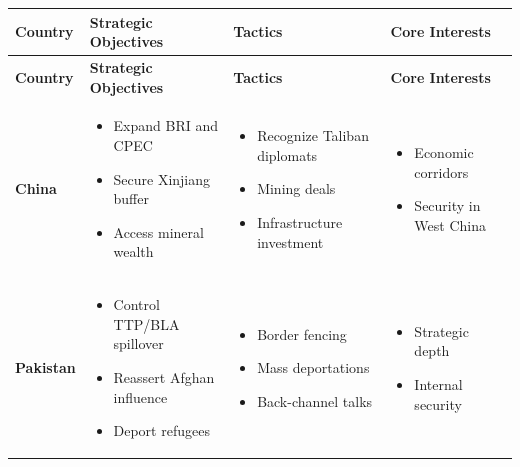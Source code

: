 \documentclass[11pt]{article}
\begin{document}
\begin{longtable}{|p{2.5cm}|p{4.5cm}|p{4.5cm}|p{4.5cm}|}
\hline
\textbf{Country} & \textbf{Strategic Objectives} & \textbf{Tactics} & \textbf{Core Interests} \\
\hline
\endfirsthead
\hline
\textbf{Country} & \textbf{Strategic Objectives} & \textbf{Tactics} & \textbf{Core Interests} \\
\hline
\endhead

\textbf{China} &
\begin{itemize}[leftmargin=*]
\item Expand BRI and CPEC
\item Secure Xinjiang buffer
\item Access mineral wealth
\end{itemize} &
\begin{itemize}[leftmargin=*]
\item Recognize Taliban diplomats
\item Mining deals
\item Infrastructure investment
\end{itemize} &
\begin{itemize}[leftmargin=*]
\item Economic corridors
\item Security in West China
\end{itemize} \\
\hline

\textbf{Pakistan} &
\begin{itemize}[leftmargin=*]
\item Control TTP/BLA spillover
\item Reassert Afghan influence
\item Deport refugees
\end{itemize} &
\begin{itemize}[leftmargin=*]
\item Border fencing
\item Mass deportations
\item Back-channel talks
\end{itemize} &
\begin{itemize}[leftmargin=*]
\item Strategic depth
\item Internal security
\end{itemize} \\
\hline


\end{longtable}
\end{document}
